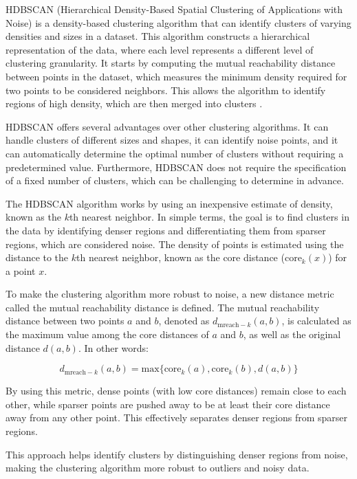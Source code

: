 \documentclass[fleqn,usenatbib,usedcolumn,useAMS]{mnras}
\begin{document}
HDBSCAN (Hierarchical Density-Based Spatial Clustering of Applications with Noise) is a density-based clustering algorithm that can identify clusters of varying densities and sizes in a dataset. This algorithm constructs a hierarchical representation of the data, where each level represents a different level of clustering granularity. It starts by computing the mutual reachability distance between points in the dataset, which measures the minimum density required for two points to be considered neighbors. This allows the algorithm to identify regions of high density, which are then merged into clusters \citep{McInnes2017}.

HDBSCAN offers several advantages over other clustering algorithms. It can handle clusters of different sizes and shapes, it can identify noise points, and it can automatically determine the optimal number of clusters without requiring a predetermined value. Furthermore, HDBSCAN does not require the specification of a fixed number of clusters, which can be challenging to determine in advance.

The HDBSCAN algorithm works by using an inexpensive estimate of density, known as the $k$th nearest neighbor. In simple terms, the goal is to find clusters in the data by identifying denser regions and differentiating them from sparser regions, which are considered noise. The density of points is estimated using the distance to the $k$th nearest neighbor, known as the core distance ($\textrm{core}_k(x)$) for a point $x$.

To make the clustering algorithm more robust to noise, a new distance metric called the mutual reachability distance is defined. The mutual reachability distance between two points $a$ and $b$, denoted as $d_{\textrm{mreach}-k}(a, b)$, is calculated as the maximum value among the core distances of $a$ and $b$, as well as the original distance $d(a, b)$. In other words:

\begin{equation}
d_{\textrm{mreach}-k}(a, b) = \textrm{max}\{\textrm{core}_k(a), \textrm{core}_k(b), d(a, b)\}
\end{equation}

By using this metric, dense points (with low core distances) remain close to each other, while sparser points are pushed away to be at least their core distance away from any other point. This effectively separates denser regions from sparser regions.

This approach helps identify clusters by distinguishing denser regions from noise, making the clustering algorithm more robust to outliers and noisy data.
\end{document}
